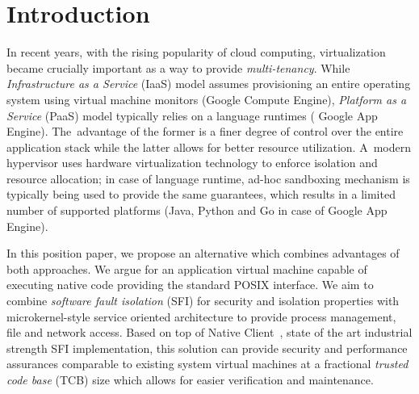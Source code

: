 \section{Introduction}
\label{sec:intro}


In recent years, with the rising popularity of cloud computing,
virtualization became crucially important as a way to provide
\emph{multi-tenancy}. While \emph{Infrastructure as a Service} (IaaS)
model assumes provisioning an entire operating system using virtual
machine monitors (\eg Google Compute Engine), \emph{Platform as a
Service} (PaaS) model typically relies on a language runtimes (\eg
Google App Engine). The~advantage of the former is a finer degree of
control over the entire application stack while the latter allows for
better resource utilization. A~modern hypervisor uses hardware
virtualization technology to enforce isolation and resource allocation;
in case of language runtime, ad-hoc sandboxing mechanism is typically
being used to provide the same guarantees, which results in a limited
number of supported platforms (\eg Java, Python and Go in case of Google
App Engine).



In this position paper, we propose an alternative which combines
advantages of both approaches. We argue for an application virtual
machine capable of executing native code providing the standard POSIX
interface. We aim to combine \emph{software fault isolation} (SFI) for
security and isolation properties with microkernel-style service oriented
architecture to provide process management, file and network access.
Based on top of Native Client~\cite{yee:ieee-sp09}, state of the art
industrial strength SFI implementation, this solution can provide
security and performance assurances comparable to existing system
virtual machines at a fractional \emph{trusted code base} (TCB) size
which allows for easier verification and maintenance. 

